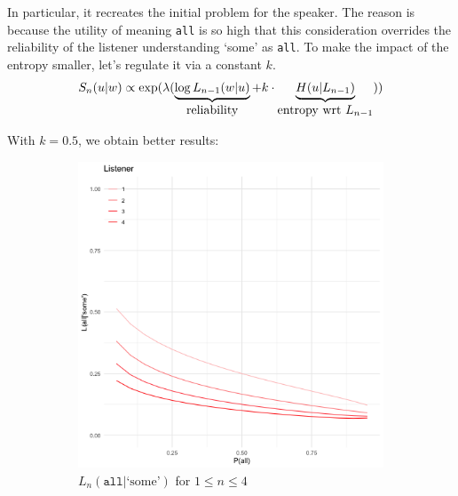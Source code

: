 \documentclass[12pt, a4paper, usenames, dvipsnames]{article}
\begin{document}
In particular, it recreates the initial problem for the speaker. The reason is because the utility of meaning \texttt{all} is so high that this consideration overrides the reliability of the listener understanding `some' as \texttt{all}. To make the impact of the entropy smaller, let's regulate it via a constant $k$.
\[
S_n(u|w) \propto \exp(\lambda (\underbrace{\log L_{n-1}(w|u)}_{\text{\normalsize reliability}} + k\cdot\underbrace{H(u|L_{n-1})}_{\text{\normalsize entropy wrt $L_{n-1}$}}))
\]

With $k=0.5$, we obtain better results:
\begin{figure}[!htb]
  \begin{subfigure}{.48\linewidth} 
    \includegraphics[width=\textwidth]{graphs/shannonRSA-L05.png}
    \caption{\(L_n(\texttt{all}|\text{`some'})\) for \(1\leq n\leq 4\)}
  \end{subfigure}
  \begin{subfigure}{.48\linewidth} 

\end{subfigure}
\end{figure}
\end{document}
